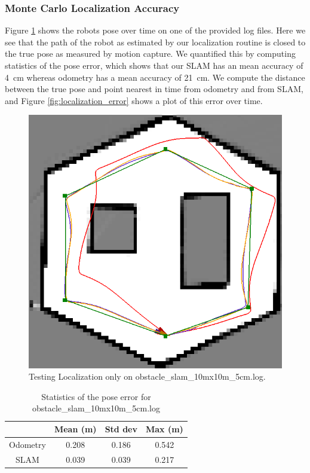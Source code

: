\documentclass[journal]{IEEEtran}
\begin{document}
        \subsubsection{Monte Carlo Localization Accuracy}
        
            Figure \ref{fig:localization} shows the robots pose over time on one of the provided log files. Here we see that the path of the robot as estimated by our localization routine is closed to the true pose as measured by motion capture. We quantified this by computing statistics of the pose error, which shows that our SLAM has an mean accuracy of \SI{4}{\centi\meter} whereas odometry has a mean accuracy of \SI{21}{\centi\meter}. We compute the distance between the true pose and point nearest in time from odometry and from SLAM, and Figure \ref{fig:localization_error} shows a plot of this error over time.
            
            \begin{figure}
                \centering
                \includegraphics[width=1\linewidth]{obstacle_slam_10mx10m_5cm.png}
                \caption{Testing Localization only on obstacle\_slam\_10mx10m\_5cm.log.}
                \label{fig:localization}
            \end{figure}
            
            \begin{table}[b]
                \centering
                \begin{tabular}{|c|c|c|c|} \hline
                  & Mean (m) &   Std dev &   Max (m) \\ \hline
                  Odometry & 0.208  & 0.186  &  0.542 \\ \hline
                  SLAM & 0.039 & 0.039 &  0.217 \\ \hline
                \end{tabular}
            \caption{Statistics of the pose error for obstacle\_slam\_10mx10m\_5cm.log}
                \label{tab:localization_error}
            \end{table}
            
\end{document}
